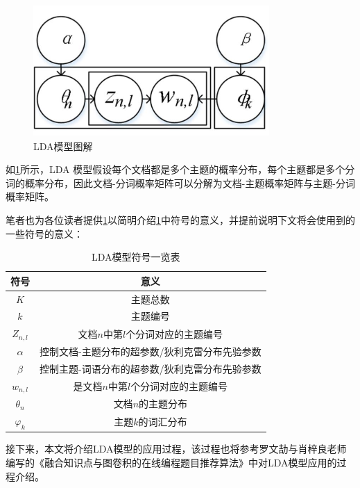 \begin{figure}[htbp]
    \centering
    \label{photo041942}
    \includegraphics[width=9cm,height=5cm]{res/LDA.jpg}
    \caption{LDA模型图解}
\end{figure} 

如\ref{photo041942}所示，LDA 模型假设每个文档都是多个主题的概率分布，每个主题都是多个分词的概率分布，因此文档-分词概率矩阵可以分解为文档-主题概率矩阵与主题-分词概率矩阵。

笔者也为各位读者提供\ref{table041937}以简明介绍\ref{photo041942}中符号的意义，并提前说明下文将会使用到的一些符号的意义：

\begin{table}[htbp]
    \centering
    \label{table041937}
    \caption{LDA模型符号一览表}
    \begin{tabular}{@{}cc@{}}
    \toprule
    符号            & 意义                        \\ \midrule
    $K$           & 主题总数                      \\
    $k$           & 主题编号                      \\
    $Z_{n,l}$     & 文档$n$中第$l$个分词对应的主题编号      \\
    $\alpha$      & 控制文档-主题分布的超参数/狄利克雷分布先验参数 \\
    $\beta$       & 控制主题-词语分布的超参数/狄利克雷分布先验参数 \\
    $w_{n,l}$     & 是文档$n$中第$l$个分词对应的主题编号     \\
    $\theta _{n}$ & 文档$n$的主题分布                \\
    $\varphi_{k}$ & 主题$k$的词汇分布                \\ \bottomrule
    \end{tabular}
\end{table}

接下来，本文将介绍LDA模型的应用过程，该过程也将参考罗文劼与肖梓良老师编写的《融合知识点与图卷积的在线编程题目推荐算法》\cite{LuoRongHeZhiShiDianYuTuJuanJiDeZaiXianBianChengTiMuTuiJianSuanFa}中对LDA模型应用的过程介绍。

